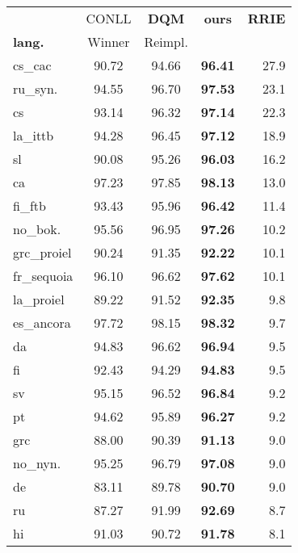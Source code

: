 \documentclass[11pt,a4paper]{article}
\begin{document}
\begin{table}[]
\begin{center}
\small
\renewcommand{\arraystretch}{.92}
\begin{tabular}{|l|c||c|c|r|}
\hline 
             &   CONLL    &\bf{DQM}      & \bf ours  &\bf RRIE\\
\bf lang.    &   Winner   & Reimpl.      &           &        \\ \hline
cs\_cac      &     90.72  &     94.66    & \bf 96.41 &  27.9\\
ru\_syn.     &     94.55  &     96.70    & \bf 97.53 &  23.1\\
cs           &     93.14  &     96.32    & \bf 97.14 &  22.3\\
la\_ittb     &     94.28  &     96.45    & \bf 97.12 &  18.9\\
sl           &     90.08  &     95.26    & \bf 96.03 &  16.2\\
ca           &     97.23  &     97.85    & \bf 98.13 &  13.0\\
fi\_ftb      &     93.43  &     95.96    & \bf 96.42 &  11.4\\
no\_bok.     &     95.56  &     96.95    &\bf  97.26 &  10.2\\
grc\_proiel  &     90.24  &     91.35    & \bf 92.22 &  10.1\\
fr\_sequoia  &     96.10  &     96.62    & \bf 97.62 &  10.1\\
la\_proiel   &     89.22  &     91.52    & \bf 92.35 &   9.8\\
es\_ancora   &     97.72  &     98.15    & \bf 98.32 &   9.7\\
da           &     94.83  &     96.62    & \bf 96.94 &   9.5\\
fi           &     92.43  &     94.29    & \bf 94.83 &   9.5\\
sv           &     95.15  &     96.52    & \bf 96.84 &   9.2\\
pt           &     94.62  &     95.89    & \bf 96.27 &   9.2\\
grc          &     88.00  &     90.39    & \bf 91.13 &   9.0\\
no\_nyn.     &     95.25  &     96.79    &\bf  97.08 &   9.0\\
de           &     83.11  &     89.78    & \bf 90.70 &   9.0\\
ru           &     87.27  &     91.99    & \bf 92.69 &   8.7\\
hi           &     91.03  &     90.72    &\bf  91.78 &   8.1\\

\end{tabular}
\end{center}
\end{table}
\end{document}
